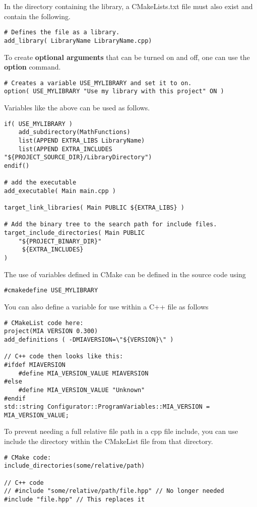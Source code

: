 In the directory containing the library, a CMakeLists.txt file must also exist and contain the following.
\begin{lstlisting}
# Defines the file as a library.
add_library( LibraryName LibraryName.cpp)
\end{lstlisting}

To create \textbf{optional arguments} that can be turned on and off, one can use the \textbf{option} command.
\begin{lstlisting}
# Creates a variable USE_MYLIBRARY and set it to on.
option( USE_MYLIBRARY "Use my library with this project" ON )
\end{lstlisting}

Variables like the above can be used as follows.
\begin{lstlisting}
if( USE_MYLIBRARY )
	add_subdirectory(MathFunctions)
	list(APPEND EXTRA_LIBS LibraryName)
	list(APPEND EXTRA_INCLUDES "${PROJECT_SOURCE_DIR}/LibraryDirectory")
endif()

# add the executable
add_executable( Main main.cpp )

target_link_libraries( Main PUBLIC ${EXTRA_LIBS} )

# Add the binary tree to the search path for include files.
target_include_directories( Main PUBLIC
	"${PROJECT_BINARY_DIR}"
	 ${EXTRA_INCLUDES}
)
\end{lstlisting}

The use of variables defined in CMake can be defined in the source code using
\begin{lstlisting}
#cmakedefine USE_MYLIBRARY
\end{lstlisting}

You can also define a variable for use within a C++ file as follows
\begin{lstlisting}
# CMakeList code here:
project(MIA VERSION 0.300)
add_definitions ( -DMIAVERSION=\"${VERSION}\" )

// C++ code then looks like this:
#ifdef MIAVERSION
	#define MIA_VERSION_VALUE MIAVERSION
#else
	#define MIA_VERSION_VALUE "Unknown"
#endif
std::string Configurator::ProgramVariables::MIA_VERSION = MIA_VERSION_VALUE;
\end{lstlisting}

To prevent needing a full relative file path in a cpp file include, you can use include the directory within the CMakeList file from that directory.
\begin{lstlisting}
# CMake code:
include_directories(some/relative/path)

// C++ code
// #include "some/relative/path/file.hpp" // No longer needed
#include "file.hpp" // This replaces it
\end{lstlisting}